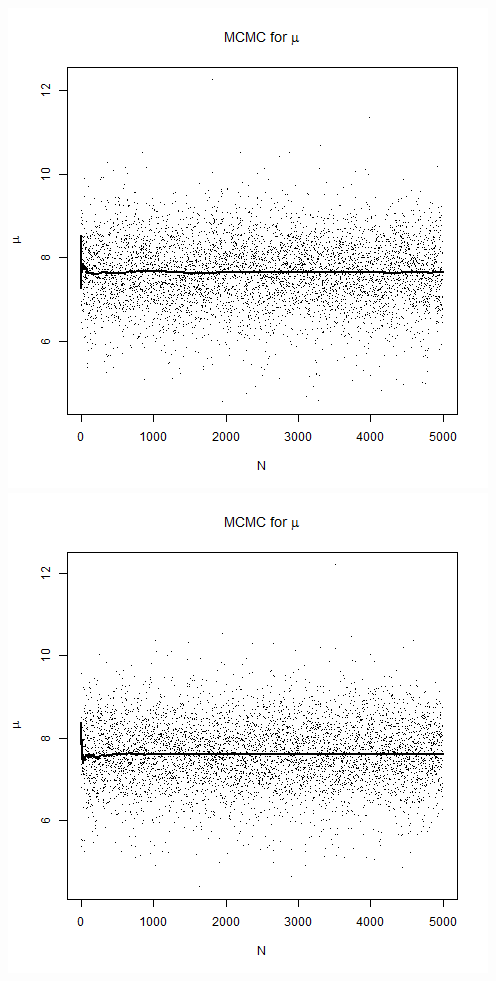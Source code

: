 \documentclass{article}
\begin{document}
\begin{enumerate}[8.1]
\begin{enumerate}[(a)]
\includegraphics[scale = 0.3]{mu.png}
\includegraphics[scale = 0.3]{mu-a.png}

\end{enumerate}
\end{enumerate}
\end{document}
